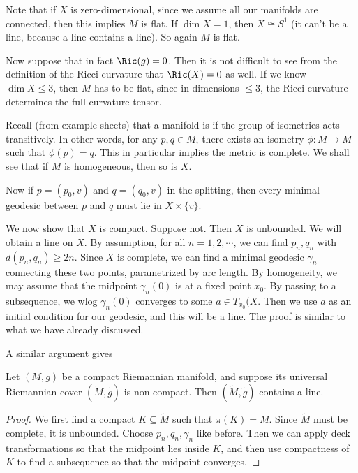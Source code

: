 \documentclass[a4paper]{article}
\begin{document}
Note that if $X$ is zero-dimensional, since we assume all our manifolds are connected, then this implies $M$ is flat. If $\dim X = 1$, then $X \cong S^1$ (it can't be a line, because a line contains a line). So again $M$ is flat.

Now suppose that in fact $\Ric(g) = 0$. Then it is not difficult to see from the definition of the Ricci curvature that $\Ric(X) = 0$ as well. If we know $\dim X \leq 3$, then $M$ has to be flat, since in dimensions $\leq 3$, the Ricci curvature determines the full curvature tensor.

Recall (from example sheets) that a manifold is  if the group of isometries acts transitively. In other words, for any $p, q \in M$, there exists an isometry $\phi: M \to M$ such that $\phi(p) = q$. This in particular implies the metric is complete. We shall see that if $M$ is homogeneous, then so is $X$.

Now if $p = (p_0, v)$ and $q = (q_0, v)$ in the splitting, then every minimal geodesic between $p$ and $q$ must lie in $X \times \{v\}$.

We now show that $X$ is compact. Suppose not. Then $X$ is unbounded. We will obtain a line on $X$. By assumption, for all $n = 1, 2, \cdots$, we can find $p_n, q_n$ with $d(p_n, q_n) \geq 2n$. Since $X$ is complete, we can find a minimal geodesic $\gamma_n$ connecting these two points, parametrized by arc length. By homogeneity, we may assume that the midpoint $\gamma_n(0)$ is at a fixed point $x_0$. By passing to a subsequence, we wlog $\dot{\gamma}_n(0)$ converges to some $a \in T_{x_0}(X$. Then we use $a$ as an initial condition for our geodesic, and this will be a line. The proof is similar to what we have already discussed.

A similar argument gives
\begin{lemma}
  Let $(M, g)$ be a compact Riemannian manifold, and suppose its universal Riemannian cover $(\tilde{M}, \tilde{g})$ is non-compact. Then $(\tilde{M}, \tilde{g})$ contains a line.
\end{lemma}

\begin{proof}
  We first find a compact $K \subseteq \tilde{M}$ such that $\pi(K) = M$. Since $\tilde{M}$ must be complete, it is unbounded. Choose $p_n, q_n, \gamma_n$ like before. Then we can apply deck transformations so that the midpoint lies inside $K$, and then use compactness of $K$ to find a subsequence so that the midpoint converges.
\end{proof}
\end{document}
